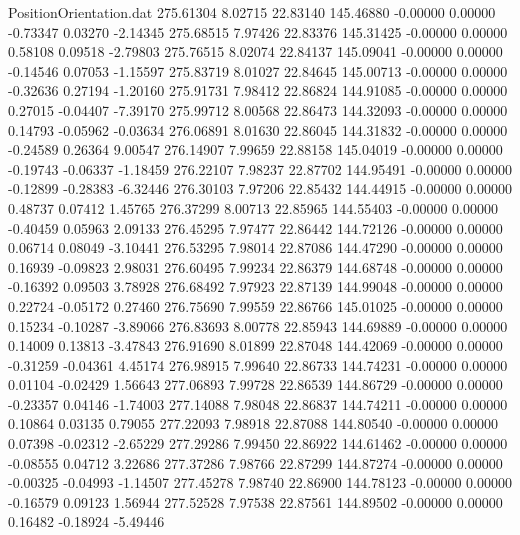 \begin{filecontents}{PositionOrientation.dat}
 275.61304    8.02715   22.83140   145.46880   -0.00000    0.00000   -0.73347    0.03270   -2.14345
 275.68515    7.97426   22.83376   145.31425   -0.00000    0.00000    0.58108    0.09518   -2.79803
 275.76515    8.02074   22.84137   145.09041   -0.00000    0.00000   -0.14546    0.07053   -1.15597
 275.83719    8.01027   22.84645   145.00713   -0.00000    0.00000   -0.32636    0.27194   -1.20160
 275.91731    7.98412   22.86824   144.91085   -0.00000    0.00000    0.27015   -0.04407   -7.39170
 275.99712    8.00568   22.86473   144.32093   -0.00000    0.00000    0.14793   -0.05962   -0.03634
 276.06891    8.01630   22.86045   144.31832   -0.00000    0.00000   -0.24589    0.26364    9.00547
 276.14907    7.99659   22.88158   145.04019   -0.00000    0.00000   -0.19743   -0.06337   -1.18459
 276.22107    7.98237   22.87702   144.95491   -0.00000    0.00000   -0.12899   -0.28383   -6.32446
 276.30103    7.97206   22.85432   144.44915   -0.00000    0.00000    0.48737    0.07412    1.45765
 276.37299    8.00713   22.85965   144.55403   -0.00000    0.00000   -0.40459    0.05963    2.09133
 276.45295    7.97477   22.86442   144.72126   -0.00000    0.00000    0.06714    0.08049   -3.10441
 276.53295    7.98014   22.87086   144.47290   -0.00000    0.00000    0.16939   -0.09823    2.98031
 276.60495    7.99234   22.86379   144.68748   -0.00000    0.00000   -0.16392    0.09503    3.78928
 276.68492    7.97923   22.87139   144.99048   -0.00000    0.00000    0.22724   -0.05172    0.27460
 276.75690    7.99559   22.86766   145.01025   -0.00000    0.00000    0.15234   -0.10287   -3.89066
 276.83693    8.00778   22.85943   144.69889   -0.00000    0.00000    0.14009    0.13813   -3.47843
 276.91690    8.01899   22.87048   144.42069   -0.00000    0.00000   -0.31259   -0.04361    4.45174
 276.98915    7.99640   22.86733   144.74231   -0.00000    0.00000    0.01104   -0.02429    1.56643
 277.06893    7.99728   22.86539   144.86729   -0.00000    0.00000   -0.23357    0.04146   -1.74003
 277.14088    7.98048   22.86837   144.74211   -0.00000    0.00000    0.10864    0.03135    0.79055
 277.22093    7.98918   22.87088   144.80540   -0.00000    0.00000    0.07398   -0.02312   -2.65229
 277.29286    7.99450   22.86922   144.61462   -0.00000    0.00000   -0.08555    0.04712    3.22686
 277.37286    7.98766   22.87299   144.87274   -0.00000    0.00000   -0.00325   -0.04993   -1.14507
 277.45278    7.98740   22.86900   144.78123   -0.00000    0.00000   -0.16579    0.09123    1.56944
 277.52528    7.97538   22.87561   144.89502   -0.00000    0.00000    0.16482   -0.18924   -5.49446

\end{filecontents}
